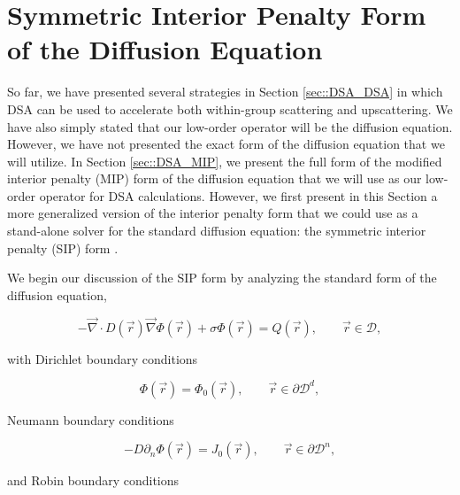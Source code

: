 \section{Symmetric Interior Penalty Form of the Diffusion Equation}
\label{sec::DSA_SIP}

So far, we have presented several strategies in Section \ref{sec::DSA_DSA} in which DSA can be used to accelerate both within-group scattering and upscattering. We have also simply stated that our low-order operator will be the diffusion equation. However, we have not presented the exact form of the diffusion equation that we will utilize. In Section \ref{sec::DSA_MIP}, we present the full form of the modified interior penalty (MIP) form of the diffusion equation that we will use as our low-order operator for DSA calculations. However, we first present in this Section a more generalized version of the interior penalty form that we could use as a stand-alone solver for the standard diffusion equation: the symmetric interior penalty (SIP) form \cite{arnold2002unified,ragusa2015discontinuous,ref::SIP_3D}.

We begin our discussion of the SIP form by analyzing the standard form of the diffusion equation,

\begin{equation}
\label{eq::DSA_standard_diff_eq}
- \vec{\nabla}  \cdot D (\vec{r})  \vec{\nabla} \Phi (\vec{r}) + \sigma \Phi (\vec{r}) = Q (\vec{r}) , \qquad \vec{r} \in \mathcal{D} ,
\end{equation}

\noindent with Dirichlet boundary conditions

\begin{equation}
\label{eq::DSA_standard_diff_eq_dirichlet_bound}
\Phi (\vec{r}) = \Phi_0 (\vec{r}), \qquad \vec{r} \in \partial \mathcal{D}^d ,
\end{equation}

\noindent Neumann boundary conditions

\begin{equation}
\label{eq::DSA_standard_diff_eq_neumann_bound}
- D \partial_n \Phi (\vec{r}) = J_0 (\vec{r}), \qquad \vec{r} \in \partial \mathcal{D}^n ,
\end{equation}

\noindent and Robin boundary conditions

